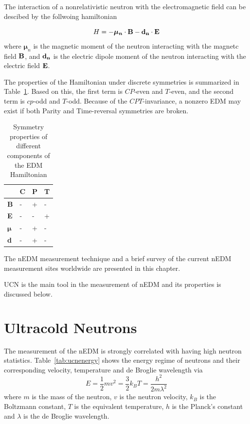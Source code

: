The interaction of a nonrelativistic neutron with
the electromagnetic field can be descibed by the follwoing
hamiltonian

\begin{equation}
  \label{eqn:hamiltonian}
 H= -\boldsymbol{\mu_n} \cdot \bf{B} - \bf{d}_n \cdot \bf{E}
 \end{equation}
where $\boldsymbol{\mu}_n$ is the magnetic moment of the neutron
interacting with the magnetc field $\bf{B}$, and $\bf{d}_n$ is
the electric dipole moment of the neutron interacting with the
electric field $\bf{E}$.

The properties of the Hamiltonian under discrete symmetries is
summarized in Table~\ref{tab:Hsymmetry}. Based on this, the first term
is $CP$-even and $T$-even, and the second term is $cp$-odd and
$T$-odd. Because of the $CPT$-invariance, a nonzero EDM may exist if
both Parity and Time-reversal symmetries are broken.


\begin{table}[h!]
  \label{tab:Hsymmetry}
\begin{center}
\begin{tabular}{| l | l | l | l |} 
\hline
 & C & P & T \\ \hline
\textbf{B} & - &+ &- \\ \hline
\textbf{E} & -&- &+ \\ \hline
$\boldsymbol{\mu}$ &- &+ &- \\ \hline 
\textbf{d} & -&+ &- \\ \hline
\end{tabular}
\caption{Symmetry properties of different components of the EDM
  Hamiltonian}
\end{center}
\end{table}
  
The nEDM measurement technique and a brief survey of the current nEDM
measurement sites worldwide are presented in this chapter.





UCN is the main tool in the measurement of nEDM and its properties is
discussed below.
\section{Ultracold Neutrons}
The measurement of the nEDM is strongly correlated with having high
neutron statistics. Table~\ref{tab:ucnenergy} shows the energy regime
of neutrons and their corresponding velocity, temperature and de
Broglie wavelength via
\begin{equation}
  \label{eqn:ucnenergy}
  E = \frac{1}{2} m v^2 = \frac{3}{2} k_B T = \frac{h^2}{2m \lambda^2}
\end{equation}
where $m$ is the mass of the neutron, $v$ is the neutron velocity,
$k_B$ is the Boltzmann constant, $T$ is the equivalent temperature,
$h$ is the Planck's constant and $\lambda$ is the de Broglie
wavelength.

